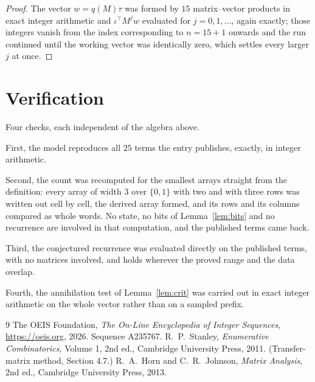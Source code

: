 \documentclass[11pt,a4paper]{article}
\theoremstyle{plain}
\theoremstyle{definition}
\begin{document}
\begin{proof}
The vector $w=q(M)\tau$ was formed by $15$ matrix--vector products in exact integer
arithmetic and $\iota^{\!\top}M^{j}w$ evaluated for $j=0,1,\dots$, again exactly; those
integers vanish from the index corresponding to $n=15+1$ onwards and the run continued
until the working vector was identically zero, which settles every larger $j$ at once.
\end{proof}

\section{Verification}

Four checks, each independent of the algebra above.

First, the model reproduces all $25$ terms the entry publishes, exactly, in integer
arithmetic.

Second, the count was recomputed for the smallest arrays straight from the definition: every
array of width $3$ over $\{0,1\}$ with two and with three rows was written out cell by cell,
the derived array formed, and its rows and its columns compared as whole words. No state, no
bits of Lemma~\ref{lem:bits} and no recurrence are involved in that computation, and the
published terms came back.

Third, the conjectured recurrence was evaluated directly on the published terms, with no
matrices involved, and holds wherever the proved range and the data overlap.

Fourth, the annihilation test of Lemma~\ref{lem:crit} was carried out in exact integer
arithmetic on the whole vector rather than on a sampled prefix.

\begin{thebibliography}{9}
 The OEIS Foundation, \emph{The On-Line Encyclopedia of Integer
Sequences}, \url{https://oeis.org}, 2026. Sequence A235767.
 R.~P.~Stanley, \emph{Enumerative Combinatorics}, Volume 1, 2nd ed.,
Cambridge University Press, 2011. (Transfer-matrix method, Section 4.7.)
 R.~A.~Horn and C.~R.~Johnson, \emph{Matrix Analysis}, 2nd ed., Cambridge
University Press, 2013.
\end{thebibliography}
\end{document}
